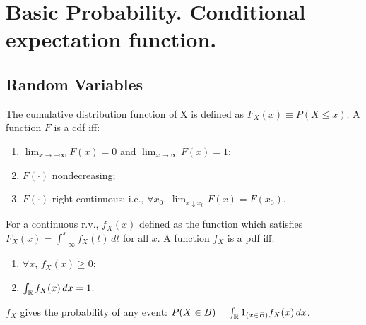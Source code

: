 \documentclass[DIV=14,titlepage=false]{scrreprt}
\begin{document}
\vspace{-10pt}
\chapter{Basic Probability. Conditional expectation function.}
\section{Random Variables}

\begin{definition}
  The cumulative distribution function of X is  defined as $ F_X(x) \equiv P(X \leq x) $. 
  A function $ F $ is a cdf iff:
  \begin{enumerate}
  \item $ \lim_{x \to -\infty} F(x) = 0 $ and $ \lim_{x \to \infty} F(x) = 1 $;
  \item $ F (\cdot) $ nondecreasing;
  \item $ F (\cdot) $ right-continuous; i.e., $ \forall x_0 $, $ \lim_{x \downarrow x_0} F(x) = F(x_0) $.
  \end{enumerate}
\end{definition}
\vspace{5pt}
\begin{definition}
  For a continuous r.v., $ f_X (x) $ defined as the function which satisfies $ F_X(x) = \int_{-\infty}^{x} f_X(t) \, dt $ for all $ x $. A function $ f_X $ is a pdf iff:
  \begin{enumerate}
  \item $ \forall x $, $ f_X(x) \geq 0 $;
  \item $ \int_{\mathbb{R}} f_X(x) \, dx = 1 $.
  \end{enumerate}
\end{definition}
\vspace{5pt}
$ f_X $ gives the probability of any event: $ P (X \in B) = \int_{\mathbb{R}} 1_{(x \in B)} f_X(x) \, dx $.
\end{document}

